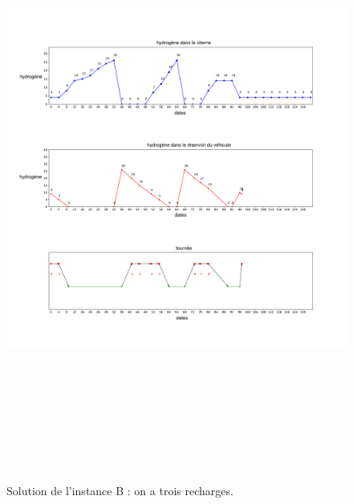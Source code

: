\begin{figure}[H]
	\centerline{
		\includegraphics[height=20cm]{images_these/Pipe_sol_24.pdf}}
	\caption[La solution de l'instance B]{Solution de l'instance B : on a trois recharges.}
	\label{Pipe_S_Inst_1}
\end{figure}

